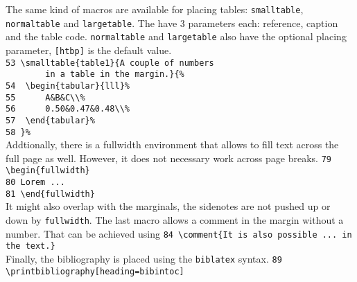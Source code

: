 \documentclass[]{caesar_book}
\begin{document}
The same kind of macros are available for placing tables: \texttt{smalltable}, \texttt{normaltable} and \texttt{largetable}. The have 3 parameters each: reference, caption and the table code. \texttt{normaltable} and \texttt{largetable} also have the optional placing parameter, \texttt{[htbp]} is the default value.\\
\verb+53 \smalltable{table1}{A couple of numbers+\\
\verb+        in a table in the margin.}{%+\\
\verb+54  \begin{tabular}{lll}%+\\
\verb+55      A&B&C\\%+\\
\verb+56      0.50&0.47&0.48\\%+\\
\verb+57  \end{tabular}%+\\
\verb+58 }%+\\
Addtionally, there is a fullwidth environment that allows to fill text across the full page as well. However, it does not necessary work across page breaks.
\verb+79 \begin{fullwidth}+\\
\verb+80 Lorem ...+\\
\verb+81 \end{fullwidth}+\\
It might also overlap with the marginals, the sidenotes are not pushed up or down by \texttt{fullwidth}. 
The last macro allows a comment in the margin without a number. That can be achieved using
\verb+84 \comment{It is also possible ... in the text.}+\\
Finally, the bibliography is placed using the \texttt{biblatex} syntax.
\verb+89 \printbibliography[heading=bibintoc]+\\
\end{document}
